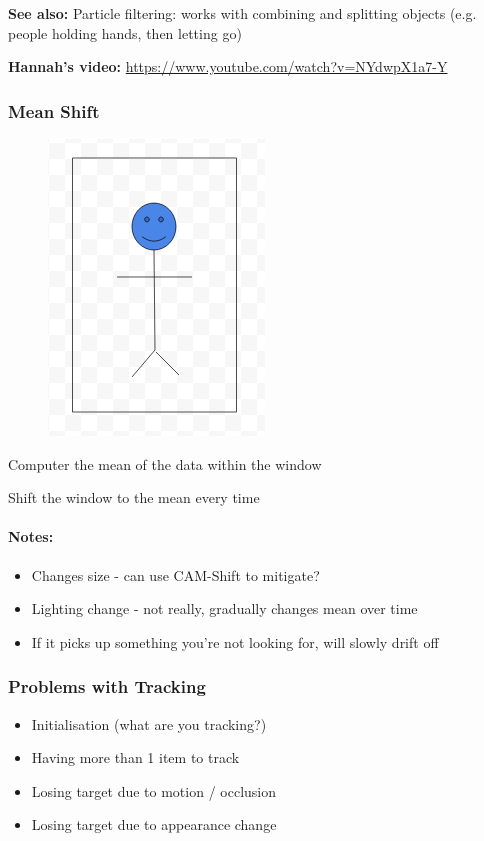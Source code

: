 \documentclass[paper=a4, fontsize=11pt]{article} %
\numberwithin{equation}{section} %
\numberwithin{figure}{section} %
\numberwithin{table}{section} %
\begin{document}
\textbf{See also:} Particle filtering: works with combining and splitting objects (e.g. people holding hands, then letting go)

\textbf{Hannah's video: } \url{https://www.youtube.com/watch?v=NYdwpX1a7-Y}

\subsubsection{Mean Shift}

\begin{figure}
\includegraphics[scale = 0.5]{images/mean_shift}
\end{figure}

Computer the mean of the data within the window

Shift the window to the mean every time

\paragraph{Notes:}
\begin{itemize}
\item Changes size - can use CAM-Shift to mitigate?
\item Lighting change - not really, gradually changes mean over time
\item If it picks up something you're not looking for, will slowly drift off
\end{itemize}

\subsubsection{Problems with Tracking}

\begin{itemize}
\item Initialisation (what are you tracking?)
\item Having more than 1 item to track
\item Losing target due to motion / occlusion
\item Losing target due to appearance change
\end{itemize}
\end{document}
